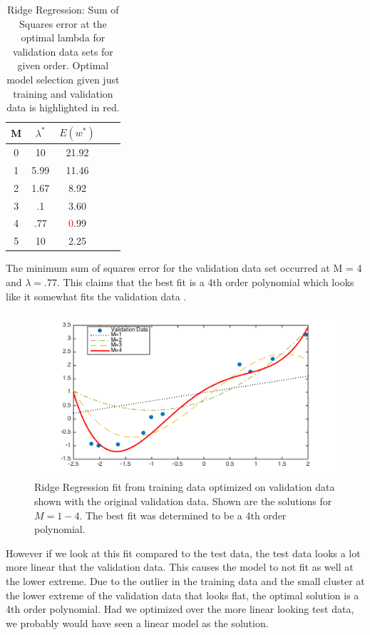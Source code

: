 \documentclass[10pt,twocolumn]{article}
\begin{document}
\begin{table}
\begin{center}
  \begin{tabular}{ | c | c | c | c | c | }
    \hline
     M & $\lambda ^*$  &$ E(w^*)$ \\ \hline
     0 & 10 & 21.92  \\ \hline
     1 & 5.99 & 11.46   \\ \hline
     2 &1.67 & 8.92   \\ \hline
     3 & .1 & 3.60   \\ \hline
     4 & .77 & \textcolor{red}{0}.99   \\ \hline
     5 & 10 & 2.25  \\ \hline    
    \hline
  \end{tabular}
  \caption{Ridge Regression:  Sum of Squares error at the optimal lambda for validation data sets for given order. Optimal model selection given just training and validation data is highlighted in red. }
\end{center}
\label{table:ave_sse}
\end{table}



The minimum sum of squares error for the validation data set occurred at M = 4 and $\lambda = .77$. This claims that the best fit is a 4th order polynomial which looks like it somewhat fits the validation data .
\begin{figure}[H]
\center
\includegraphics[scale =.5]{modelcomparison.png}
\caption{Ridge Regression fit from training data optimized on validation data shown with the original validation data. Shown are the solutions for $M=1-4$. The best fit was determined to be a 4th order polynomial.}
\end{figure}

However if we look at this fit compared to the test data, the test data looks a lot more linear that the validation data. This causes the model to not fit as well at the lower extreme.  Due to the outlier in the training data and the small cluster at the lower extreme of the validation data that looks flat, the optimal solution is a 4th order polynomial. Had we optimized over the more linear looking test data, we probably would have seen a linear model as the solution. 
\end{document}
